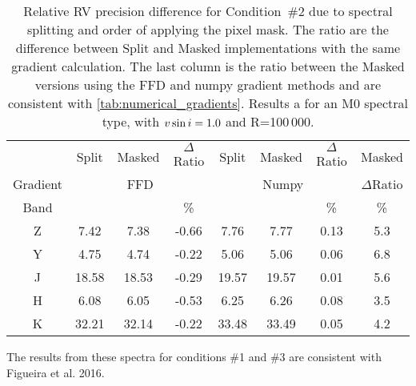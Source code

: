 
\begin{table}
    \centering
    \caption{Relative {RV} precision difference for Condition~\#2 due to spectral splitting and order of applying the pixel mask. The ratio are the difference between Split and Masked implementations with the same gradient calculation. The last column is the ratio between the Masked versions using the {FFD} and numpy gradient methods and are consistent with \cref{tab:numerical_gradients}. Results a for an M0 spectral type, with $v\sin{i}=1.0$ and R=100\,000.}
    \begin{tabular}{c|ccc|ccc|c}
        \toprule
        & Split & Masked & \(\Delta\)Ratio & Split & Masked & \(\Delta\)Ratio & Masked \\
        Gradient & \multicolumn{3}{c|}{FFD} & \multicolumn{3}{c|}{Numpy} & \(\Delta\)Ratio\\
        Band & \mps{} & \mps{} &  \%  & \mps{} & \mps{} &   \% & \% \\
        \midrule
        Z &  7.42 &  7.38 & -0.66 &  7.76 &  7.77 & 0.13 & 5.3\\
        Y &  4.75 &  4.74 & -0.22 &  5.06 &  5.06 & 0.06 & 6.8\\
        J & 18.58 & 18.53 & -0.29 & 19.57 & 19.57 & 0.01 & 5.6\\
        H &  6.08 &  6.05 & -0.53 &  6.25 &  6.26 & 0.08 & 3.5\\
        K & 32.21 & 32.14 & -0.22 & 33.48 & 33.49 & 0.05 & 4.2\\
        \bottomrule
    \end{tabular}\label{tab:mask_ordering}
\end{table}

{\rd{} The results from these spectra for conditions \#1 and \#3 are consistent with Figueira et al. 2016. }
